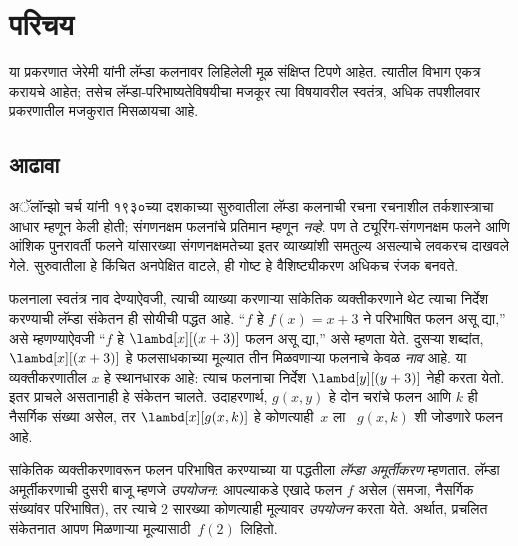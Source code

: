 \chapter{परिचय}\label{lam:int:chap}
\begin{editorial}
या प्रकरणात जेरेमी यांनी लॅम्डा कलनावर लिहिलेली मूळ संक्षिप्त टिपणे आहेत.
त्यातील विभाग एकत्र करायचे आहेत; तसेच लॅम्डा-परिभाष्यतेविषयीचा मजकूर
त्या विषयावरील स्वतंत्र, अधिक तपशीलवार प्रकरणातील मजकुरात मिसळायचा आहे.
\end{editorial}








\section{आढावा}\label{lam:int:ovr:sec}

अॅलॉन्झो चर्च यांनी १९३०च्या दशकाच्या सुरुवातीला लॅम्डा कलनाची रचना
रचनाशील तर्कशास्त्राचा आधार म्हणून केली होती; संगणनक्षम फलनांचे
प्रतिमान म्हणून \emph{नव्हे}. पण ते ट्यूरिंग-संगणनक्षम फलने आणि आंशिक
पुनरावर्ती फलने यांसारख्या संगणनक्षमतेच्या इतर व्याख्यांशी समतुल्य
असल्याचे लवकरच दाखवले गेले. सुरुवातीला हे किंचित अनपेक्षित वाटले,
ही गोष्ट हे वैशिष्ट्यीकरण अधिकच रंजक बनवते.

फलनाला स्वतंत्र नाव देण्याऐवजी, त्याची व्याख्या करणाऱ्या सांकेतिक
व्यक्तीकरणाने थेट त्याचा निर्देश करण्याची लॅम्डा संकेतन ही सोयीची
पद्धत आहे. “$f$ हे $f(x) = x + 3$ ने परिभाषित फलन असू द्या,” असे
म्हणण्याऐवजी “$f$ हे $\lambd[x][(x + 3)]$ फलन असू द्या,” असे म्हणता
येते. दुसऱ्या शब्दांत, $\lambd[x][(x+3)]$ हे फलसाधकाच्या मूल्यात तीन मिळवणाऱ्या
फलनाचे केवळ \emph{नाव} आहे. या व्यक्तीकरणातील $x$ हे स्थानधारक आहे: त्याच फलनाचा निर्देश
$\lambd[y][(y + 3)]$ नेही करता येतो. इतर प्राचले असतानाही हे संकेतन
चालते. उदाहरणार्थ, $g(x, y)$ हे दोन चरांचे फलन आणि $k$ ही नैसर्गिक
संख्या असेल, तर $\lambd[x][g(x,k)]$ हे कोणत्याही~$x$ ला
~$g(x, k)$ शी जोडणारे फलन आहे.

सांकेतिक व्यक्तीकरणावरून फलन परिभाषित करण्याच्या या पद्धतीला
\emph{लॅम्डा अमूर्तीकरण} म्हणतात. लॅम्डा अमूर्तीकरणाची दुसरी बाजू
म्हणजे \emph{उपयोजन}: आपल्याकडे एखादे फलन $f$ असेल (समजा, नैसर्गिक
संख्यांवर परिभाषित), तर त्याचे 2 सारख्या कोणत्याही मूल्यावर
\emph{उपयोजन} करता येते. अर्थात, प्रचलित संकेतनात आपण मिळणाऱ्या
मूल्यासाठी~$f(2)$ लिहितो.

